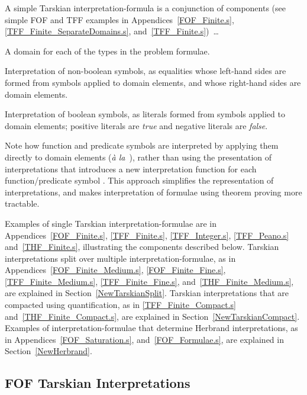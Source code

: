 \documentclass{easychair}
\newenvironment{packed_itemize}{
\vspace*{-0.3em}
\begin{itemize}
\setlength{\partopsep}{0pt}
\setlength{\itemsep}{1pt}
\setlength{\parskip}{0pt}
\setlength{\parsep}{0pt}
}{\end{itemize}}
\begin{document}
A simple Tarskian interpretation-formula is a conjunction of components (see simple FOF and TFF
examples in Appendices~\ref{FOF_Finite.s}, \ref{TFF_Finite_SeparateDomains.s}, 
and~\ref{TFF_Finite.s})~\ldots
\begin{packed_itemize}
\item A domain for each of the types in the problem formulae.
\item Interpretation of non-boolean symbols, as equalities whose left-hand sides are formed from 
      symbols applied to domain elements, and whose right-hand sides are domain elements.
\item Interpretation of boolean symbols, as literals formed from symbols applied to domain 
      elements; positive literals are \emph{true} and negative literals are \emph{false}.
\end{packed_itemize}

Note how function and predicate symbols are interpreted by applying them directly to domain
elements (\emph{{\`a} la}~\cite[\S5.3.4]{Gal15}), rather than using the presentation of 
interpretations that introduces a new interpretation function for each function/predicate symbol 
\cite[\S5.3.2]{Gal15}.
This approach simplifies the representation of interpretations, and makes interpretation of 
formulae using theorem proving more tractable.

Examples of single Tarskian interpretation-formulae are in Appendices~\ref{FOF_Finite.s}, 
\ref{TFF_Finite.s}, \ref{TFF_Integer.s}, \ref{TFF_Peano.s} and~\ref{THF_Finite.s}, illustrating 
the components described below. 
Tarskian interpretations split over multiple interpretation-formulae, as in 
Appendices~\ref{FOF_Finite_Medium.s}, \ref{FOF_Finite_Fine.s}, \ref{TFF_Finite_Medium.s}, 
\ref{TFF_Finite_Fine.s}, and~\ref{THF_Finite_Medium.s}, are explained in 
Section~\ref{NewTarskianSplit}.
Tarskian interpretations that are compacted using quantification, as in \ref{TFF_Finite_Compact.s}
and~\ref{THF_Finite_Compact.s}, are explained in Section~\ref{NewTarskianCompact}.
Examples of interpretation-formulae that determine Herbrand interpretations, as in 
Appendices~\ref{FOF_Saturation.s}, and~\ref{FOF_Formulae.s}, are explained in 
Section~\ref{NewHerbrand}.

\subsection{FOF Tarskian Interpretations}
\label{NewTarskianFOF}
\end{document}
